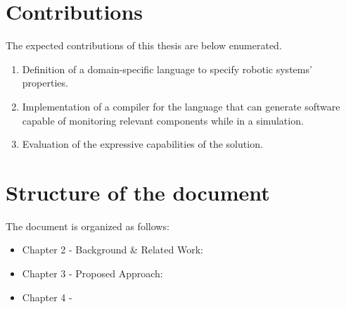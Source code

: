 \section{Contributions}
\label{sec:contributions}

The expected contributions of this thesis are below enumerated.

\begin{enumerate}
    \item Definition of a domain-specific language to specify robotic systems' properties.
    \item Implementation of a compiler for the language that can generate software capable of monitoring relevant components while in a simulation.
    \item Evaluation of the expressive capabilities of the solution.
\end{enumerate}

\section{Structure of the document}
\label{sec:structure}

The document is organized as follows:

\begin{itemize}
    \item Chapter 2 - Background \& Related Work:
    \item Chapter 3 - Proposed Approach:
    \item Chapter 4 -
\end{itemize}


